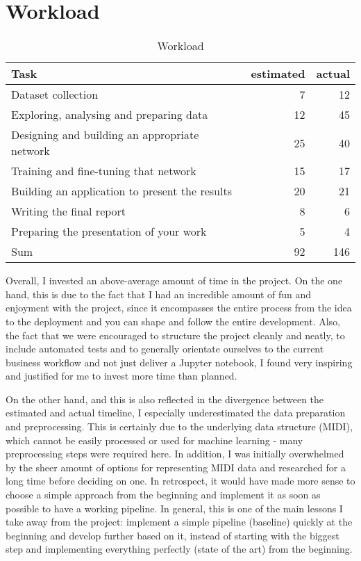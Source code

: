 \documentclass[a4paper, 10pt, xcolor=dvipsnames]{article} %
\begin{document}
\section{Workload}
\begin{table}[!h]
  \begin{center}
    \begin{tabular}{lrr}
      Task                                           & estimated & actual \\
      \hline
      \hline
      Dataset collection                             & 7         & 12     \\
      Exploring, analysing and preparing data        & 12        & 45     \\
      Designing and building an appropriate network  & 25        & 40     \\
      Training and fine-tuning that network          & 15        & 17     \\
      Building an application to present the results & 20        & 21     \\
      Writing the final report                       & 8         & 6      \\
      Preparing the presentation of your work        & 5         & 4      \\
      \hline
      Sum                                            & 92        & 146
    \end{tabular}
    \caption{Workload}
  \end{center}
\end{table}

Overall, I invested an above-average amount of time in the project. On the one
hand, this is due to the fact that I had an incredible amount of fun and
enjoyment with the project, since it encompasses the entire process from the
idea to the deployment and you can shape and follow the entire development.
Also, the fact that we were encouraged to structure the project cleanly and
neatly, to include automated tests and to generally orientate ourselves to the
current business workflow and not just deliver a Jupyter notebook, I found very
inspiring and justified for me to invest more time than planned.

On the other hand, and this is also reflected in the divergence between the
estimated and actual timeline, I especially underestimated the data preparation
and preprocessing. This is certainly due to the underlying data structure
(MIDI), which cannot be easily processed or used for machine learning - many
preprocessing steps were required here. In addition, I was initially
overwhelmed by the sheer amount of options for representing MIDI data and
researched for a long time before deciding on one. In retrospect, it would have
made more sense to choose a simple approach from the beginning and implement it
as soon as possible to have a working pipeline. In general, this is one of the
main lessons I take away from the project: implement a simple pipeline
(baseline) quickly at the beginning and develop further based on it, instead of
starting with the biggest step and implementing everything perfectly (state of
the art) from the beginning.
\end{document}

